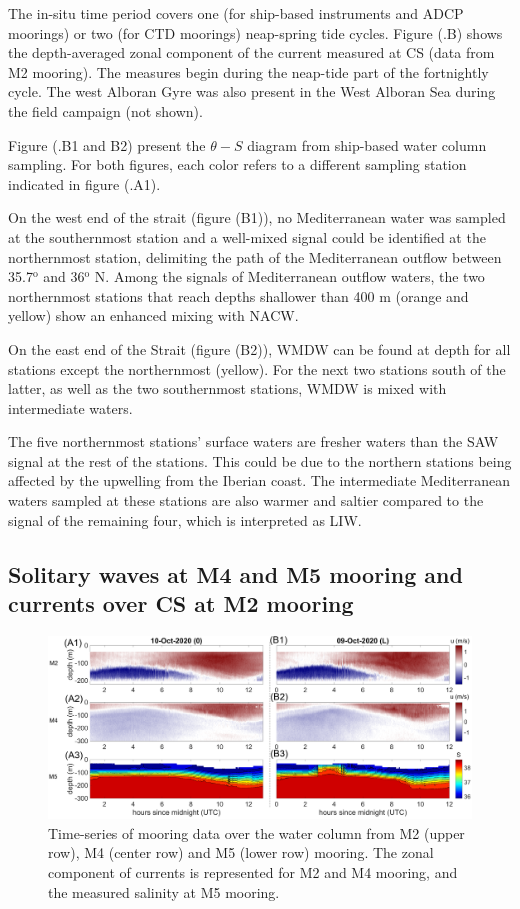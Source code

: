 The in-situ time period covers one (for ship-based instruments and ADCP moorings) or two (for CTD moorings) neap-spring tide cycles. Figure (.B) shows the depth-averaged zonal component of the current measured at CS (data from M2 mooring). The measures begin during the neap-tide part of the fortnightly cycle. The west Alboran Gyre was also present in the West Alboran Sea during the field campaign (not shown). 

Figure (.B1 and B2) present the $\theta-S$ diagram from ship-based water column sampling. For both figures, each color refers to a different sampling station indicated in figure (.A1).

On the west end of the strait (figure (B1)), no Mediterranean water was sampled at the southernmost station and a well-mixed signal could be identified at the northernmost station, delimiting the path of the Mediterranean outflow between 35.7$^{\text{o}}$ and 36$^{\text{o}}$ N. Among the signals of Mediterranean outflow waters, the two northernmost stations that reach depths shallower than 400 m (orange and yellow) show an enhanced mixing with NACW.

On the east end of the Strait (figure (B2)), WMDW can be found at depth for all stations except the northernmost (yellow). For the next two stations south of the latter, as well as the two southernmost stations, WMDW is mixed with intermediate waters. 

The five northernmost stations' surface waters are fresher waters than the SAW signal at the rest of the stations. This could be due to the northern stations being affected by the upwelling from the Iberian coast. The intermediate Mediterranean waters sampled at these stations are also warmer and saltier compared to the signal of the remaining four, which is interpreted as LIW.


\subsection{Solitary waves at M4 and M5 mooring and currents over CS at M2 mooring}
\label{section_obs_moor}

\begin{figure}[!h]
 \includegraphics[width=\textwidth]{./GBR3D/US_moorings1.png}
 \caption [Time-series of mooring data from M2, M4 and M5]{Time-series of mooring data over the water column from M2 (upper row), M4 (center row) and M5 (lower row) mooring. The zonal component of currents is represented for M2 and M4 mooring, and the measured salinity at M5 mooring.}
 \label{fig_moor_US1}
\end{figure}

